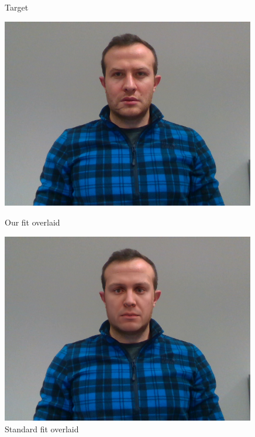 \begin{figure}[h]
    \centering
    \begin{minipage}{.325\textwidth}
      \centering
      \caption*{Target}
      \includegraphics[width=0.99\textwidth]{Figures/dataset/target/1.png}
    \end{minipage}
    \begin{minipage}{.325\textwidth}
      \centering
      \caption*{Our fit overlaid}
      \includegraphics[width=0.99\textwidth]{Figures/dataset/our/1blended.png}
    \end{minipage}
    \begin{minipage}{.325\textwidth}
      \centering
      \caption*{Standard fit overlaid}

\end{minipage}
\end{figure}
